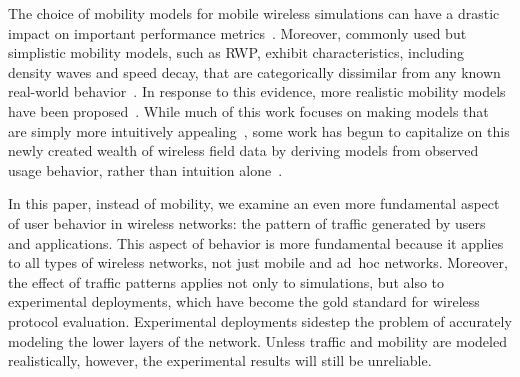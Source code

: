 \documentclass[twocolumn,final]{svjour3}
\newcommand{\caps}[1]{{\small{#1}}}
\begin{document}
The choice of mobility models for mobile wireless simulations can have a drastic impact on important performance metrics~\cite{Camp02,Yoon03:speed-decay,Yoon03:sound-models,Jardosh03,Zheng04}. Moreover, commonly used but simplistic mobility models, such as \caps{RWP}, exhibit characteristics, including density waves and speed decay, that are categorically dissimilar from any known real-world behavior~\cite{Royer01,Yoon03:speed-decay,Yoon03:sound-models}. In response to this evidence, more realistic mobility models have been proposed~\cite{Jardosh03,Tuduce05,Jardosh05:voronoi}. While much of this work focuses on making models that are simply more intuitively appealing~\cite{Jardosh03,Jardosh05:voronoi}, some work has begun to capitalize on this newly created wealth of wireless field data by deriving models from observed usage behavior, rather than intuition alone~\cite{Balazinska03,Tuduce05}.

In this paper, instead of mobility, we examine an even more fundamental aspect of user behavior in wireless networks: the pattern of traffic generated by users and applications. This aspect of behavior is more fundamental because it applies to all types of wireless networks, not just mobile and ad~hoc networks. Moreover, the effect of traffic patterns applies not only to simulations, but also to experimental deployments, which have become the gold standard for wireless protocol evaluation.  Experimental deployments sidestep the problem of accurately modeling the lower layers of the network. Unless traffic and mobility are modeled realistically, however, the experimental results will still be unreliable.
\end{document}
